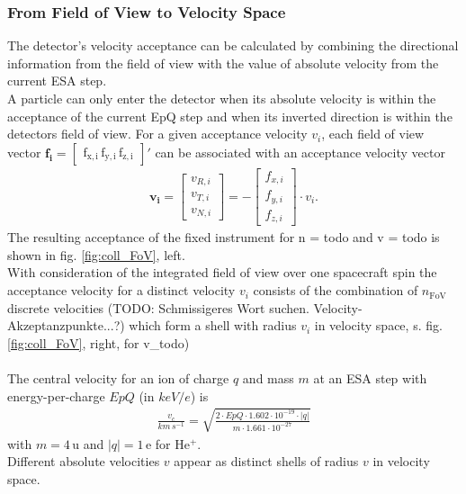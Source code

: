 \subsubsection{From Field of View to Velocity Space}
The detector's velocity acceptance can be calculated by combining the directional information from the field of view with the value of absolute velocity from the current ESA step. 
\\
A particle can only enter the detector when its absolute velocity is within the acceptance of the current EpQ step and when its inverted direction is within the detectors field of view. For a given acceptance velocity $v_i$, each field of view vector $\mathrm{\mathbf{f_i} = \begin{bmatrix}f_{x,i}\,f_{y,i}\,f_{z,i}\end{bmatrix}}'$ can be associated with an acceptance velocity vector
\begin{align}
\mathbf{v_i} = \begin{bmatrix}v_{R,i}\\v_{T,i}\\v_{N,i}\end{bmatrix} = - \begin{bmatrix}f_{x,i}\\f_{y,i}\\f_{z,i}\end{bmatrix} \cdot v_i.
\label{eq:fov}
\end{align}
The resulting acceptance of the fixed instrument for n = todo and v = todo is shown in fig. \ref{fig:coll_FoV}, left. \\
With consideration of the integrated field of view over one spacecraft spin the acceptance velocity for a distinct velocity $v_i$ consists of the combination of $n_\mathrm{FoV}$ discrete velocities (TODO: Schmissigeres Wort suchen. Velocity-Akzeptanzpunkte...?) which form a shell with radius $v_i$ in velocity space, s. fig. \ref{fig:coll_FoV}, right, for v\_todo)
\\ \\
The central velocity for an ion of charge $q$ and mass $m$ at an ESA step with energy-per-charge $EpQ$ (in $keV/e$) is
\begin{align*}
\frac{v_c}{km \, s^{-1}} = \sqrt{\frac{2 \cdot EpQ \cdot 1.602\cdot10^{-19}\cdot |q|}{m \cdot 1.661 \cdot 10^{-27}} }
\end{align*}
with $m = 4\,\mathrm{u}$ and $|q| = 1\,\mathrm{e}$ for $\mathrm{He^{+}}$.
\\
Different absolute velocities $v$ appear as distinct shells of radius $v$ in velocity space.
